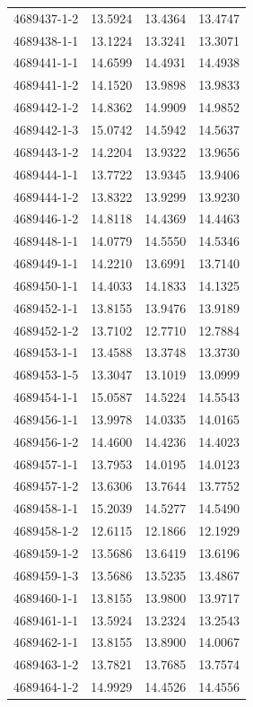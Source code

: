 \begin{longtable}{lrrr}
4689437-1-2 & 13.5924 & 13.4364 & 13.4747 \\
4689438-1-1 & 13.1224 & 13.3241 & 13.3071 \\
4689441-1-1 & 14.6599 & 14.4931 & 14.4938 \\
4689441-1-2 & 14.1520 & 13.9898 & 13.9833 \\
4689442-1-2 & 14.8362 & 14.9909 & 14.9852 \\
4689442-1-3 & 15.0742 & 14.5942 & 14.5637 \\
4689443-1-2 & 14.2204 & 13.9322 & 13.9656 \\
4689444-1-1 & 13.7722 & 13.9345 & 13.9406 \\
4689444-1-2 & 13.8322 & 13.9299 & 13.9230 \\
4689446-1-2 & 14.8118 & 14.4369 & 14.4463 \\
4689448-1-1 & 14.0779 & 14.5550 & 14.5346 \\
4689449-1-1 & 14.2210 & 13.6991 & 13.7140 \\
4689450-1-1 & 14.4033 & 14.1833 & 14.1325 \\
4689452-1-1 & 13.8155 & 13.9476 & 13.9189 \\
4689452-1-2 & 13.7102 & 12.7710 & 12.7884 \\
4689453-1-1 & 13.4588 & 13.3748 & 13.3730 \\
4689453-1-5 & 13.3047 & 13.1019 & 13.0999 \\
4689454-1-1 & 15.0587 & 14.5224 & 14.5543 \\
4689456-1-1 & 13.9978 & 14.0335 & 14.0165 \\
4689456-1-2 & 14.4600 & 14.4236 & 14.4023 \\
4689457-1-1 & 13.7953 & 14.0195 & 14.0123 \\
4689457-1-2 & 13.6306 & 13.7644 & 13.7752 \\
4689458-1-1 & 15.2039 & 14.5277 & 14.5490 \\
4689458-1-2 & 12.6115 & 12.1866 & 12.1929 \\
4689459-1-2 & 13.5686 & 13.6419 & 13.6196 \\
4689459-1-3 & 13.5686 & 13.5235 & 13.4867 \\
4689460-1-1 & 13.8155 & 13.9800 & 13.9717 \\
4689461-1-1 & 13.5924 & 13.2324 & 13.2543 \\
4689462-1-1 & 13.8155 & 13.8900 & 14.0067 \\
4689463-1-2 & 13.7821 & 13.7685 & 13.7574 \\
4689464-1-2 & 14.9929 & 14.4526 & 14.4556 \\

\end{longtable}
